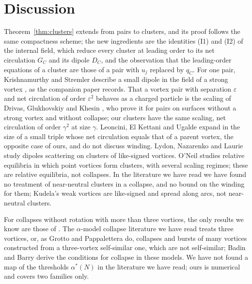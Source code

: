 \documentclass[11pt]{article}
\theoremstyle{definition}
\begin{document}
\section{Discussion}\label{sec:discussion}

Theorem~\ref{thm:clusters} extends \cite[Theorem~3]{mw2026} from pairs to clusters, and its proof follows the same compactness scheme; the new ingredients are the identities (I1) and (I2) of the internal field, which reduce every cluster at leading order to its net circulation $G_C$ and its dipole $D_C$, and the observation that the leading-order equations of a cluster are those of a pair with $u_j$ replaced by $q_C$. For one pair, Krishnamurthy and Stremler describe a small dipole in the field of a strong vortex \cite[Sect.~3.6, Fig.~9]{ks2018}, as the companion paper records. That a vortex pair with separation $\varepsilon$ and net circulation of order $\varepsilon^2$ behaves as a charged particle is the scaling of Drivas, Glukhovskiy and Khesin \cite[Theorem~1.1]{dgk2024}, who prove it for pairs on surfaces without a strong vortex and without collapse; our clusters have the same scaling, net circulation of order $\gamma^2$ at size $\gamma$. Leoncini, El Kettani and Ugalde \cite[Sect.~B]{leu2026} expand in the size of a small triple whose net circulation equals that of a parent vortex, the opposite case of ours, and do not discuss winding. Lydon, Nazarenko and Laurie \cite{lnl2022} study dipoles scattering on clusters of like-signed vortices. O'Neil \cite{oneil2011, oneil2013} studies relative equilibria in which point vortices form clusters, with several scaling regimes; these are relative equilibria, not collapses. In the literature we have read we have found no treatment of near-neutral clusters in a collapse, and no bound on the winding for them; Kudela's weak vortices \cite{kudela2021} are like-signed and spread along arcs, not near-neutral clusters.

For collapses without rotation with more than three vortices, the only results we know are those of \cite{mw2026}. The $\alpha$-model collapse literature we have read treats three vortices, or, as Grotto and Pappalettera \cite{gp2025} do, collapses and bursts of many vortices constructed from a three-vortex self-similar one, which are not self-similar; Badin and Barry \cite{bb2018} derive the conditions for collapse in these models. We have not found a map of the thresholds $\alpha^*(N)$ in the literature we have read; ours is numerical and covers two families only.
\end{document}

